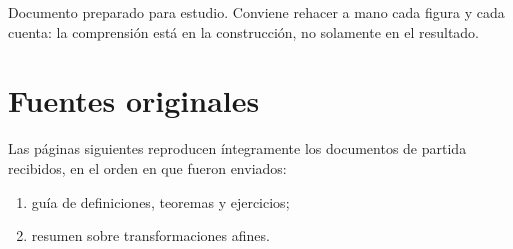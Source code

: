 \vfill
\begin{center}
\color{muted}\small
Documento preparado para estudio. Conviene rehacer a mano cada figura y cada cuenta:
la comprensión está en la construcción, no solamente en el resultado.
\end{center}

\section*{Fuentes originales}
Las páginas siguientes reproducen íntegramente los documentos de partida recibidos, en el
orden en que fueron enviados:
\begin{enumerate}
  \item guía de definiciones, teoremas y ejercicios;
  \item resumen sobre transformaciones afines.
\end{enumerate}
